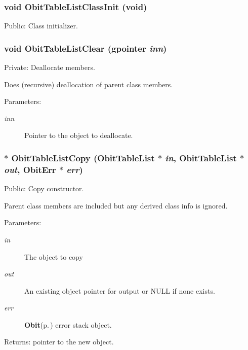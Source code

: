 \subsubsection{\setlength{\rightskip}{0pt plus 5cm}void Obit\-Table\-List\-Class\-Init (void)}\label{ObitTableList_8c_a20}


Public: Class initializer. 

\subsubsection{\setlength{\rightskip}{0pt plus 5cm}void Obit\-Table\-List\-Clear (gpointer {\em inn})}\label{ObitTableList_8c_a4}


Private: Deallocate members. 

Does (recursive) deallocation of parent class members. \begin{Desc}
\item[Parameters:]
\begin{description}
\item[{\em inn}]Pointer to the object to deallocate. \end{description}
\end{Desc}
\subsubsection{$\ast$ Obit\-Table\-List\-Copy ({\bf Obit\-Table\-List} $\ast$ {\em in}, {\bf Obit\-Table\-List} $\ast$ {\em out}, {\bf Obit\-Err} $\ast$ {\em err})}\label{ObitTableList_8c_a12}


Public: Copy constructor. 

Parent class members are included but any derived class info is ignored. \begin{Desc}
\item[Parameters:]
\begin{description}
\item[{\em in}]The object to copy \item[{\em out}]An existing object pointer for output or NULL if none exists. \item[{\em err}]{\bf Obit}{\rm (p.\,\pageref{structObit})} error stack object. \end{description}
\end{Desc}
\begin{Desc}
\item[Returns:]pointer to the new object. \end{Desc}
